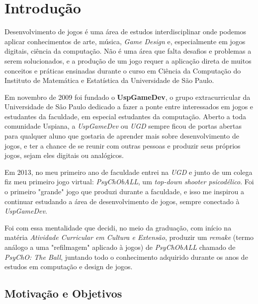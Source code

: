 \chapter{Introdução}
\label{cap:introducao}

  Desenvolvimento de jogos é uma área de estudos interdisciplinar onde podemos aplicar conhecimentos de arte, música, \textit{Game Design} e, especialmente em jogos digitais, ciência da computação. Não é uma área que falta desafios e problemas a serem solucionados, e a produção de um jogo requer a aplicação direta de muitos conceitos e práticas ensinadas durante o curso em Ciência da Computação do Instituto de Matemática e Estatística da Universidade de São Paulo.

  Em novembro de 2009 foi fundado o \textbf{UspGameDev}, o grupo extracurricular da Universidade de Sâo Paulo dedicado a fazer a ponte entre interessados em jogos e estudantes da faculdade, em especial estudantes da computação. Aberto a toda comunidade Uspiana, a \textit{UspGameDev} ou \textit{UGD} sempre ficou de portas abertas para qualquer aluno que gostaria de aprender mais sobre desenvolvimento de jogos, e ter a chance de se reunir com outras pessoas e produzir seus próprios jogos, sejam eles digitais ou analógicos.

  Em 2013, no meu primeiro ano de faculdade entrei na \textit{UGD} e junto de um colega fiz meu primeiro jogo virtual: \textit{PsyChObALL}, um \textit{top-down shooter psicodélico}. Foi o primeiro "grande" jogo que produzi durante a faculdade, e isso me inspirou a continuar estudando a área de desenvolvimento de jogos, sempre conectado à \textit{UspGameDev}.

  Foi com essa mentalidade que decidi, no meio da graduação, com início na matéria \textit{Atividade Curricular em Cultura e Extensão}, produzir um \textit{remake} (termo análogo a uma "refilmagem" aplicado à jogos) de \textit{PsyChObALL} chamado de \textit{PsyChO: The Ball}, juntando todo o conhecimento adquirido durante os anos de estudos em computação e design de jogos.


\section{Motivação e Objetivos}
\label{sec:motivacao_objetivo}

